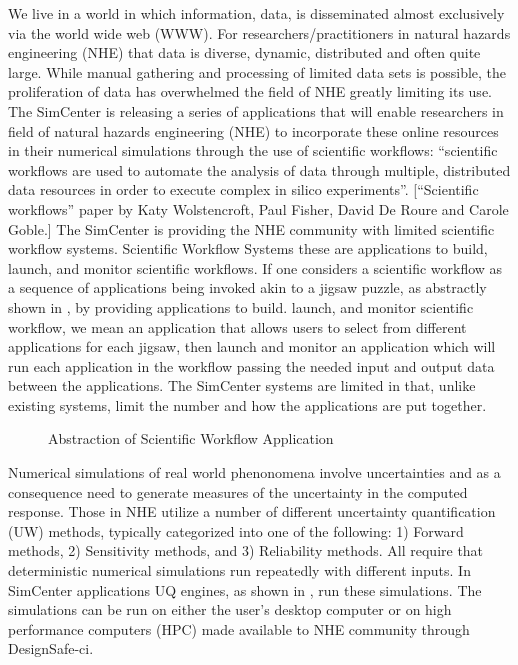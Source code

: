 We live in a world in which information, data, is disseminated almost exclusively via the world wide web (WWW).  For researchers/practitioners in natural hazards engineering (NHE) that data is diverse, dynamic, distributed and often quite large. While manual gathering and processing of limited data sets is possible, the proliferation of data has overwhelmed the field of NHE greatly limiting its use. The SimCenter is releasing a series of applications that will enable researchers in field of natural hazards engineering (NHE) to incorporate these online resources in their numerical simulations through the use of scientific workflows: “scientific workflows are used to automate the analysis of data through multiple, distributed data resources in order to execute complex in silico experiments”.  [“Scientific workflows” paper by Katy Wolstencroft, Paul Fisher, David De Roure and Carole Goble.] The SimCenter is providing the NHE community with limited scientific workflow systems. Scientific Workflow Systems these are applications to build, launch, and monitor  scientific workflows. If one considers a scientific workflow as a sequence of applications being invoked akin to a jigsaw puzzle, as abstractly shown in , by providing applications to build. launch, and monitor scientific workflow, we mean an application that allows users to select from different applications for each jigsaw, then launch and monitor an application  which will run each application in the workflow passing the needed input and output data between the applications. The SimCenter systems are limited in that, unlike existing systems, limit the number and how the applications are put together.  

\begin{figure}[!htbp]
  \caption{Abstraction of Scientific Workflow Application}
  \label{fig:jigsaw}
\end{figure}
 
Numerical simulations of real world phenonomena involve uncertainties and as a consequence need to generate measures of the uncertainty in the computed response. Those in NHE utilize a number of different uncertainty quantification (UW) methods, typically categorized into one of the following: 1) Forward methods, 2) Sensitivity methods,  and 3) Reliability methods.  All require that deterministic numerical simulations run repeatedly with different inputs. In SimCenter applications UQ engines, as shown in ,  run these simulations. The simulations can be run on either the user’s desktop computer or on high performance computers (HPC) made available to NHE community  through DesignSafe-ci.

